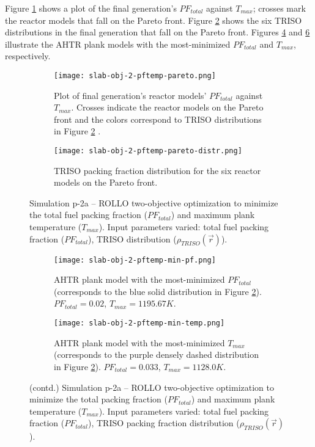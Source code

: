Figure \ref{fig:slab-obj-2-pftemp-pareto} shows a plot of the final generation's 
$PF_{total}$ against $T_{max}$; crosses mark the reactor models that 
fall on the Pareto front.
Figure \ref{fig:slab-obj-2-pftemp-pareto-distr} shows the six TRISO distributions in 
the final generation that fall on the Pareto front.
Figures \ref{fig:slab-obj-2-pftemp-min-pf} and \ref{fig:slab-obj-2-pftemp-min-temp} 
illustrate the \gls{AHTR} plank models with the most-minimized $PF_{total}$ and 
$T_{max}$, respectively.  
\begin{figure}[htbp!]
    \centering
    \begin{subfigure}{\textwidth}
        \texttt{[image: slab-obj-2-pftemp-pareto.png]}
        \caption{Plot of final generation's reactor models' $PF_{total}$ against 
        $T_{max}$. Crosses indicate the reactor models on the Pareto front and the 
        colors correspond to TRISO distributions in Figure 
        \ref{fig:slab-obj-2-pftemp-pareto-distr} .}
        \label{fig:slab-obj-2-pftemp-pareto} 
    \end{subfigure}
    \begin{subfigure}{\textwidth}
        \texttt{[image: slab-obj-2-pftemp-pareto-distr.png]}
        \caption{TRISO packing fraction distribution for the six reactor models on the 
        Pareto front.}
        \label{fig:slab-obj-2-pftemp-pareto-distr} 
    \end{subfigure}
    \caption{Simulation p-2a -- ROLLO two-objective optimization to minimize the total 
    fuel packing fraction ($PF_{total}$) and maximum plank temperature ($T_{max}$). 
    Input parameters varied: total fuel packing fraction ($PF_{total}$), 
    \gls{TRISO} distribution ($\rho_{TRISO}(\vec{r})$).}
    \label{fig:slab-obj-2-pftemp}
\end{figure}
\begin{figure}[htbp!]
    \ContinuedFloat
    \begin{subfigure}{\textwidth}
        \texttt{[image: slab-obj-2-pftemp-min-pf.png]}
        \caption{\gls{AHTR} plank model with the most-minimized $PF_{total}$
        (corresponds to the blue solid distribution in Figure 
        \ref{fig:slab-obj-2-pftemp-pareto-distr}). $PF_{total} = 0.02$, 
        $T_{max} = 1195.67K$.}
        \label{fig:slab-obj-2-pftemp-min-pf} 
    \end{subfigure}
    \begin{subfigure}{\textwidth}
        \texttt{[image: slab-obj-2-pftemp-min-temp.png]}
        \caption{\gls{AHTR} plank model with the most-minimized $T_{max}$
        (corresponds to the purple densely dashed distribution in Figure 
        \ref{fig:slab-obj-2-pftemp-pareto-distr}). $PF_{total} = 0.033$, 
        $T_{max} = 1128.0K$.}
        \label{fig:slab-obj-2-pftemp-min-temp} 
    \end{subfigure}
    \caption{(contd.) Simulation p-2a -- ROLLO two-objective optimization to minimize 
    the total packing fraction ($PF_{total}$) and maximum plank temperature ($T_{max}$). 
    Input parameters varied: total fuel packing fraction ($PF_{total}$), 
    \gls{TRISO} packing fraction distribution ($\rho_{TRISO}(\vec{r})$).}
\end{figure}


